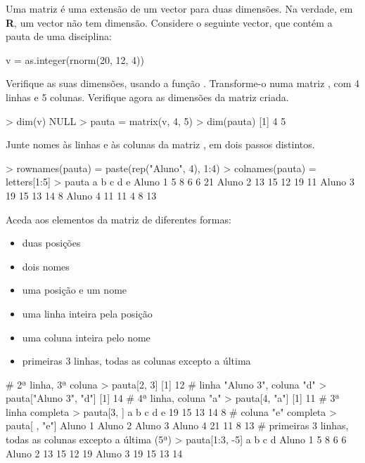 \documentclass{exam}
\begin{document}
\begin{questions}
\question Uma matriz é uma extensão de um vector para duas dimensões. Na verdade, em \textbf{R}, um vector não tem dimensão. Considere o seguinte vector, que contém a pauta de uma disciplina:
\begin{rcode}
v = as.integer(rnorm(20, 12, 4))
\end{rcode}
Verifique as suas dimensões, usando a função . Transforme-o numa matriz , com 4 linhas e 5 colunas. Verifique agora as dimensões da matriz criada.

\begin{solution}
	\begin{rcode}
		> dim(v)
		NULL
		> pauta = matrix(v, 4, 5)
		> dim(pauta)
		[1] 4 5
	\end{rcode}
\end{solution}

\question Junte nomes às linhas e às colunas da matriz , em dois passos distintos.

\begin{solution}
	\begin{rcode}
		> rownames(pauta) = paste(rep("Aluno", 4), 1:4)
		> colnames(pauta) = letters[1:5]
		> pauta
		         a  b  c  d  e
		Aluno 1  5  8  6  6 21
		Aluno 2 13 15 12 19 11
		Aluno 3 19 15 13 14  8
		Aluno 4 11 11  4  8 13
	\end{rcode}
\end{solution}

\question Aceda aos elementos da matriz de diferentes formas:
\begin{itemize}
\item duas posições
\item dois nomes
\item uma posição e um nome
\item uma linha inteira pela posição
\item uma coluna inteira pelo nome
\item primeiras 3 linhas, todas as colunas excepto a última
\end{itemize}

\begin{solution}
	\begin{rcode}
		# 2ª linha, 3ª coluna
		> pauta[2, 3]
		[1] 12
		# linha "Aluno 3", coluna "d"
		> pauta["Aluno 3", "d"]
		[1] 14
		# 4ª linha, coluna "a"
		> pauta[4, "a"]
		[1] 11
		# 3ª linha completa
		> pauta[3, ]
		a  b  c  d  e 
		19 15 13 14  8 
		# coluna "e" completa
		> pauta[ , "e"]
		Aluno 1 Aluno 2 Aluno 3 Aluno 4 
		21      11       8      13 
		# primeiras 3 linhas, todas as colunas excepto a última (5ª)
		> pauta[1:3, -5]
		         a  b  c  d
		Aluno 1  5  8  6  6
		Aluno 2 13 15 12 19
		Aluno 3 19 15 13 14
	\end{rcode}
\end{solution}


\end{questions}
\end{document}
